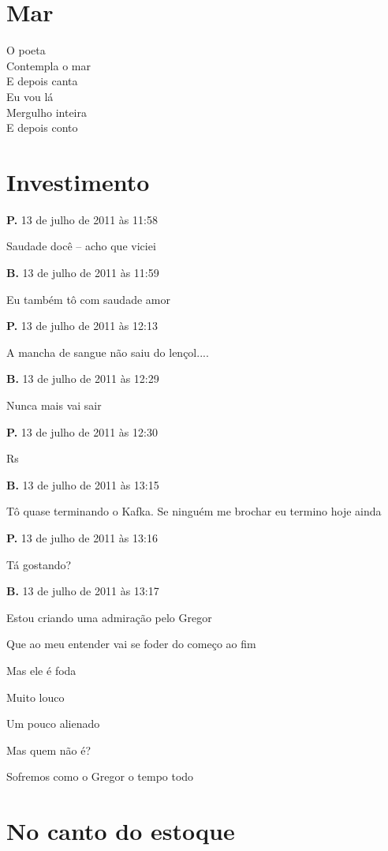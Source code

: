 \chapter{Mar}

{\parindent0pt
O poeta\\
Contempla o mar\\
E depois canta\\
Eu vou lá\\
Mergulho inteira\\
E depois conto\\
}

\chapter{Investimento}


{\parindent0pt\parskip1pt\raggedright
\textbf{P.} 13 de julho de 2011 às 11:58

Saudade docê -- acho que viciei

\textbf{B.} 13 de julho de 2011 às 11:59

Eu também tô com saudade amor

\textbf{P.} 13 de julho de 2011 às 12:13

A mancha de sangue não saiu do lençol....

\textbf{B.} 13 de julho de 2011 às 12:29

Nunca mais vai sair

\textbf{P.} 13 de julho de 2011 às 12:30

Rs

\textbf{B.} 13 de julho de 2011 às 13:15

Tô quase terminando o Kafka. Se ninguém me brochar eu termino hoje ainda

\textbf{P.} 13 de julho de 2011 às 13:16

Tá gostando?

\textbf{B.} 13 de julho de 2011 às 13:17

Estou criando uma admiração pelo Gregor

Que ao meu entender vai se foder do começo ao fim

Mas ele é foda

Muito louco

Um pouco alienado

Mas quem não é?

Sofremos como o Gregor o tempo todo

\chapter{No canto do estoque}

}

